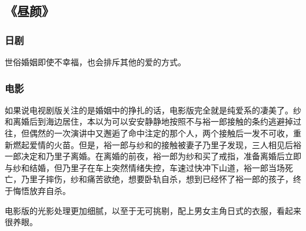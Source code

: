 \subsection{《昼颜》}

\subsubsection{日剧}
世俗婚姻即使不幸福，也会排斥其他的爱的方式。

\subsubsection{电影}
如果说电视剧版关注的是婚姻中的挣扎的话，电影版完全就是纯爱系的凄美了。纱和离婚后到海边居住，本以为可以安安静静地按照不与裕一郎接触的条约逃避掉过往，但偶然的一次演讲中又邂逅了命中注定的那个人，两个接触后一发不可收，重新燃起爱情的火苗。但是，裕一郎与纱和的接触被妻子乃里子发现，三人相见后裕一郎决定和乃里子离婚。在离婚的前夜，裕一郎为纱和买了戒指，准备离婚后立即与纱和结婚，但乃里子在车上突然情绪失控，车速过快冲下山道，裕一郎当场死亡，乃里子摔伤，纱和痛苦欲绝，想要卧轨自杀，想到已经怀了裕一郎的孩子，终于悔悟放弃自杀。

电影版的光影处理更加细腻，以至于无可挑剔，配上男女主角日式的衣服，看起来很养眼。